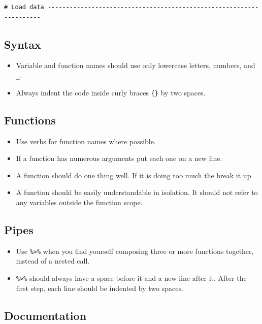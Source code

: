 \documentclass[]{book}
\providecommand{\tightlist}{%
  \setlength{\itemsep}{0pt}\setlength{\parskip}{0pt}}
\theoremstyle{definition}
\theoremstyle{definition}
\theoremstyle{definition}
\theoremstyle{remark}
\begin{document}
\begin{verbatim}
# Load data --------------------------------------------------------------------
\end{verbatim}

\subsection{Syntax}\label{syntax}

\begin{itemize}
\tightlist
\item
  Variable and function names should use only lowercase letters,
  numbers, and \texttt{\_}.
\item
  Always indent the code inside curly braces \texttt{\{\}} by two
  spaces.
\end{itemize}

\subsection{Functions}\label{functions}

\begin{itemize}
\tightlist
\item
  Use verbs for function names where possible.
\item
  If a function has numerous arguments put each one on a new line.
\item
  A function should do one thing well. If it is doing too much the break
  it up.
\item
  A function should be easily understandable in isolation. It should not
  refer to any variables outside the function scope.
\end{itemize}

\subsection{Pipes}\label{pipes}

\begin{itemize}
\tightlist
\item
  Use \texttt{\%\textgreater{}\%} when you find yourself composing three
  or more functions together, instead of a nested call.
\item
  \texttt{\%\textgreater{}\%} should always have a space before it and a
  new line after it. After the first step, each line should be indented
  by two spaces.
\end{itemize}

\subsection{Documentation}\label{documentation-1}
\end{document}
